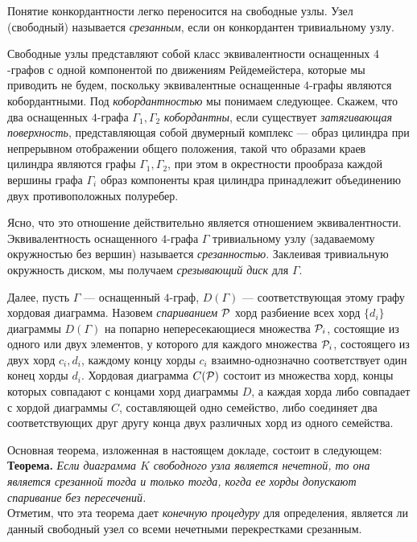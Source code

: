Понятие конкордантности легко переносится на свободные узлы. Узел (свободный) называется {\em срезанным}, если он конкордантен тривиальному узлу.

Свободные узлы представляют собой класс эквивалентности оснащенных $4$-графов с одной компонентой по движениям Рейдемейстера, которые мы приводить не будем, поскольку эквивалентные оснащенные $4$-графы являются кобордантными. Под {\em кобордантностью} мы понимаем следующее. Скажем, что два оснащенных  $4$-графа
 $\Gamma_{1},\Gamma_{2}$ {\em кобордантны}, если существует {\em затягивающая поверхность}, представляющая собой двумерный комплекс --- образ цилиндра при непрерывном отображении общего положения, такой что образами краев цилиндра являются графы $\Gamma_{1},\Gamma_{2}$, при этом в окрестности прообраза каждой вершины графа $\Gamma_{i}$ образ компоненты края цилиндра принадлежит объединению двух противоположных полуребер.

Ясно, что это отношение действительно является отношением эквивалентности. Эквивалентность оснащенного $4$-графа $\Gamma$ тривиальному узлу (задаваемому окружностью без вершин) называется {\em срезанностью}. Заклеивая тривиальную окружность диском, мы получаем {\em срезывающий диск} для $\Gamma$.

Далее, пусть $\Gamma$ --- оснащенный $4$-граф, $D(\Gamma)$ --- соответствующая этому графу хордовая диаграмма. Назовем {\em спариванием} ${\cal P}$ хорд разбиение всех хорд $\{d_{i}\}$ диаграммы $D(\Gamma)$ на попарно непересекающиеся множества ${\cal P}_{i}$, состоящие из одного или двух элементов, у которого для каждого множества ${\cal P}_{i}$, состоящего из двух хорд $c_{i},d_{i}$, каждому концу хорды $c_{i}$ взаимно-однозначно соответствует один конец хорды $d_{i}$. Хордовая диаграмма $C({\cal P})$ состоит из множества хорд, концы которых совпадают с концами хорд диаграммы $D$, а каждая хорда либо совпадает с хордой диаграммы $C$, составляющей одно семейство, либо соединяет два соответствующих друг другу конца двух различных хорд из одного семейства.

Основная теорема, изложенная в настоящем докладе, состоит в следующем: \\

{\bf Теорема.} {\it Если диаграмма $K$ свободного узла является {\em нечетной}, то она является {\em срезанной} тогда и только тогда, когда ее хорды допускают {\em спаривание без пересечений}. } \\

Отметим, что эта теорема дает {\em конечную процедуру} для определения, является ли данный
свободный узел со всеми нечетными перекрестками срезанным.


